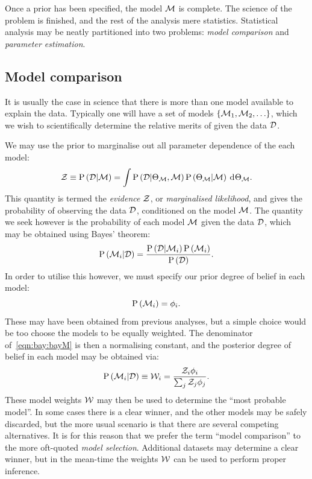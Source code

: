 Once a prior has been specified, the model $\mathcal{M}$ is complete. The science of the problem is finished, and the rest of the analysis mere statistics. Statistical analysis may be neatly partitioned into two problems: {\em model comparison\/} and {\em parameter estimation}.

\subsection{Model comparison}
It is usually the case in science that there is more than one model available to explain the data. Typically one will have a set of models ${\{\mathcal{M}_1,\mathcal{M}_2,\ldots\}}$, which we wish to scientifically determine the relative merits of given the data $\mathcal{D}$.

We may use the prior to marginalise out all parameter dependence of the each model:
\begin{equation}
  \mathcal{Z}\equiv\mathrm{P}\left(\mathcal{D}\middle|\mathcal{M}\right) 
  =
  \int  \mathrm{P}\left(\mathcal{D}\middle|\Theta_{\mathcal{M}},\mathcal{M}\right)\mathrm{P}\left(\Theta_{\mathcal{M}}\middle|\mathcal{M}\right)\:\operatorname{d}^{}\!{\Theta_{\mathcal{M}}}.
  \label{eqn:bay:ev_def}
\end{equation}
This quantity is termed the {\em evidence\/} $\mathcal{Z}$, or {\em marginalised likelihood}, and gives the probability of observing the data $\mathcal{D}$, conditioned on the model $\mathcal{M}$. The quantity we seek however is the probability of each model $\mathcal{M}$ given the data $\mathcal{D}$, which may be obtained using Bayes' theorem:
\begin{equation}
  \mathrm{P}\left(\mathcal{M}_i\middle|\mathcal{D}\right) = \frac{\mathrm{P}\left(\mathcal{D}\middle|\mathcal{M}_i\right)\mathrm{P}\left(\mathcal{M}_i\right)}{\mathrm{P}\left(\mathcal{D}\right)}.
  \label{eqn:bay:bayM}
\end{equation}
In order to utilise this however, we must specify our prior degree of belief in each model:
\begin{equation}
  \mathrm{P}\left(\mathcal{M}_i\right) = \phi_i.
\end{equation}
These may have been obtained from previous analyses, but a simple choice would be too choose the models to be equally weighted. The denominator of~\eqref{eqn:bay:bayM} is then a normalising constant, and the posterior degree of belief in each model may be obtained via:
\begin{equation}
  \mathrm{P}\left(\mathcal{M}_i\middle|\mathcal{D}\right) 
  \equiv
  \mathcal{W}_i
  =
  \frac{\mathcal{Z}_i\phi_i}{\sum_j \mathcal{Z}_j\phi_j}.
\end{equation}
These model weights $\mathcal{W}$ may then be used to determine the ``most probable model''. In some cases there is a clear winner, and the other models may be safely discarded, but the more usual scenario is that there are several competing alternatives. It is for this reason that we prefer the term ``model comparison'' to the more oft-quoted {\em model selection}. Additional datasets may determine a clear winner, but in the mean-time the weights $\mathcal{W}$ can be used to perform proper inference. 

